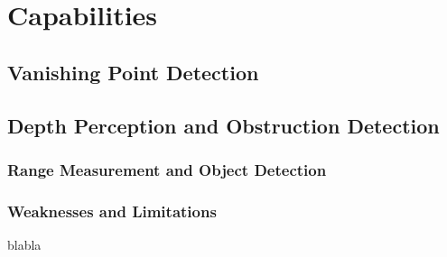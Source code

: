 \chapter{Capabilities}

\section{Vanishing Point Detection}



\section{Depth Perception and Obstruction Detection}



\subsection{Range Measurement and Object Detection}

\subsection{Weaknesses and Limitations}

blabla
